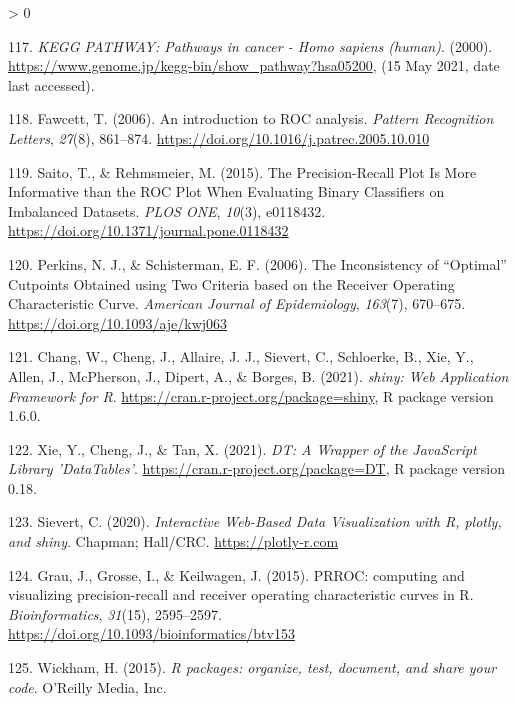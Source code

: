 \documentclass[
  12pt,
]{book}
\newlength{\cslhangindent}
\newenvironment{CSLReferences}[2] %
 {%
  \setlength{\parindent}{0pt}
  \ifodd #1 \everypar{\setlength{\hangindent}{\cslhangindent}}\ignorespaces\fi
  \ifnum #2 > 0
  \setlength{\parskip}{#2\baselineskip}
  \fi
 }%
 {}
\begin{document}
\begin{CSLReferences}{1}{0}
\leavevmode\hypertarget{ref-kegg-cancer}{}%
117. \emph{{KEGG PATHWAY: Pathways in cancer - Homo sapiens (human)}}. (2000). \url{https://www.genome.jp/kegg-bin/show_pathway?hsa05200}, (15 May 2021, date last accessed).

\leavevmode\hypertarget{ref-Fawcett2006}{}%
118. Fawcett, T. (2006). {An introduction to ROC analysis}. \emph{Pattern Recognition Letters}, \emph{27}(8), 861--874. \url{https://doi.org/10.1016/j.patrec.2005.10.010}

\leavevmode\hypertarget{ref-Saito2015}{}%
119. Saito, T., \& Rehmsmeier, M. (2015). {The Precision-Recall Plot Is More Informative than the ROC Plot When Evaluating Binary Classifiers on Imbalanced Datasets}. \emph{PLOS ONE}, \emph{10}(3), e0118432. \url{https://doi.org/10.1371/journal.pone.0118432}

\leavevmode\hypertarget{ref-Perkins2006}{}%
120. Perkins, N. J., \& Schisterman, E. F. (2006). {The Inconsistency of {``Optimal''} Cutpoints Obtained using Two Criteria based on the Receiver Operating Characteristic Curve}. \emph{American Journal of Epidemiology}, \emph{163}(7), 670--675. \url{https://doi.org/10.1093/aje/kwj063}

\leavevmode\hypertarget{ref-Chang2021}{}%
121. Chang, W., Cheng, J., Allaire, J. J., Sievert, C., Schloerke, B., Xie, Y., Allen, J., McPherson, J., Dipert, A., \& Borges, B. (2021). \emph{{shiny: Web Application Framework for R}}. \url{https://cran.r-project.org/package=shiny}, R package version 1.6.0.

\leavevmode\hypertarget{ref-Xie2021}{}%
122. Xie, Y., Cheng, J., \& Tan, X. (2021). \emph{{DT: A Wrapper of the JavaScript Library 'DataTables'}}. \url{https://cran.r-project.org/package=DT}, R package version 0.18.

\leavevmode\hypertarget{ref-Sievert2020}{}%
123. Sievert, C. (2020). \emph{{Interactive Web-Based Data Visualization with R, plotly, and shiny}}. Chapman; Hall/CRC. \url{https://plotly-r.com}

\leavevmode\hypertarget{ref-Grau2015}{}%
124. Grau, J., Grosse, I., \& Keilwagen, J. (2015). {PRROC: computing and visualizing precision-recall and receiver operating characteristic curves in R}. \emph{Bioinformatics}, \emph{31}(15), 2595--2597. \url{https://doi.org/10.1093/bioinformatics/btv153}

\leavevmode\hypertarget{ref-Wickham2015}{}%
125. Wickham, H. (2015). \emph{{R packages: organize, test, document, and share your code}}. O'Reilly Media, Inc.


\end{CSLReferences}
\end{document}

